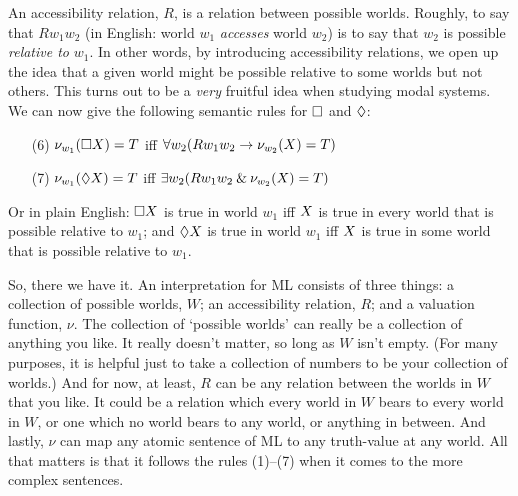 An accessibility relation, $R$, is a relation between possible worlds. Roughly, to say that $Rw_1w_2$ (in English: world $w_1$ \emph{accesses} world $w_2$) is to say that $w_2$ is possible \emph{relative to} $w_1$. In other words, by introducing accessibility relations, we open up the idea that a given world might be possible relative to some worlds but not others. This turns out to be a \emph{very} fruitful idea when studying modal systems. We can now give the following semantic rules for $\Box$ and $\Diamond$:
\begin{itemize}
	\item[(6)]$\nu_{w_1}(\Box X)=T$ iff $\forall w_2 (Rw_1w_2\rightarrow \nu_{w_2}(X)=T)$
	\item[(7)]$\nu_{w_1}(\Diamond X)=T$ iff $\exists w_2 (Rw_1w_2\mathbin{\&} \nu_{w_2}(X)=T)$
\end{itemize}
Or in plain English: $\Box X$ is true in world $w_1$ iff $X$ is true in every world that is possible relative to $w_1$; and $\Diamond X$ is true in world $w_1$ iff $X$ is true in some world that is possible relative to $w_1$.

So, there we have it. An interpretation for ML consists of three things: a collection of possible worlds, $W$; an accessibility relation, $R$; and a valuation function, $\nu$. The collection of `possible worlds' can really be a collection of anything you like. It really doesn't matter, so long as $W$ isn't empty. (For many purposes, it is helpful just to take a collection of numbers to be your collection of worlds.) And for now, at least, $R$ can be any relation between the worlds in $W$ that you like. It could be a relation which every world in $W$ bears to every world in $W$, or one which no world bears to any world, or anything in between. And lastly, $\nu$ can map any atomic sentence of ML to any truth-value at any world. All that matters is that it follows the rules (1)--(7) when it comes to the more complex sentences.

